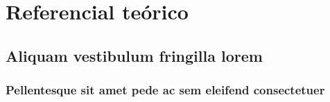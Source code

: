 

\chapter{Referencial teórico}\label{cap_trabalho_academico}

\section{Aliquam vestibulum fringilla lorem}

\lipsum[1]

\subsection{Pellentesque sit amet pede ac sem eleifend consectetuer}
\lipsum[2-3]